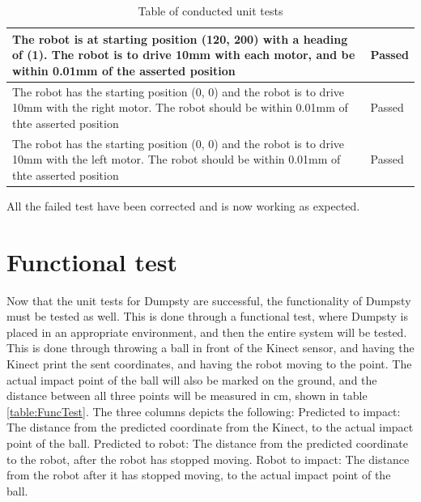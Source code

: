 \begin{table}
\begin{center}
\begin{tabular}{ | p{10cm} | p{5cm} |}
		The robot is at starting position (120, 200) with a heading of (1). The robot is to drive 10mm with each motor, and be within 0.01mm of the asserted position & Passed \\ \hline
		The robot has the starting position (0, 0) and the robot is to drive 10mm with the right motor. The robot should be within 0.01mm of thte asserted position & Passed \\ \hline
		The robot has the starting position (0, 0) and the robot is to drive 10mm with the left motor. The robot should be within 0.01mm of thte asserted position & Passed \\ \hline
	\end{tabular}
	\caption{Table of conducted unit tests}
	\label{table:Unit tests}
\end{center}
\end{table}

All the failed test have been corrected and is now working as expected. 

\section{Functional test}
\label{sec:LasseSucks}
Now that the unit tests for Dumpsty are successful, the functionality of Dumpsty must be tested as well. This is done through a functional test, where Dumpsty is placed in an appropriate environment, and then the entire system will be tested. This is done through throwing a ball in front of the Kinect sensor, and having the Kinect print the sent coordinates, and having the robot moving to the point. The actual impact point of the ball will also be marked on the ground, and the distance between all three points will be measured in cm, shown in table \ref{table:FuncTest}. \newline
The three columns depicts the following:\newline
Predicted to impact: The distance from the predicted coordinate from the Kinect, to the actual impact point of the ball.\newline
Predicted to robot: The distance from the predicted coordinate to the robot, after the robot has stopped moving.\newline
Robot to impact: The distance from the robot after it has stopped moving, to the actual impact point of the ball.

